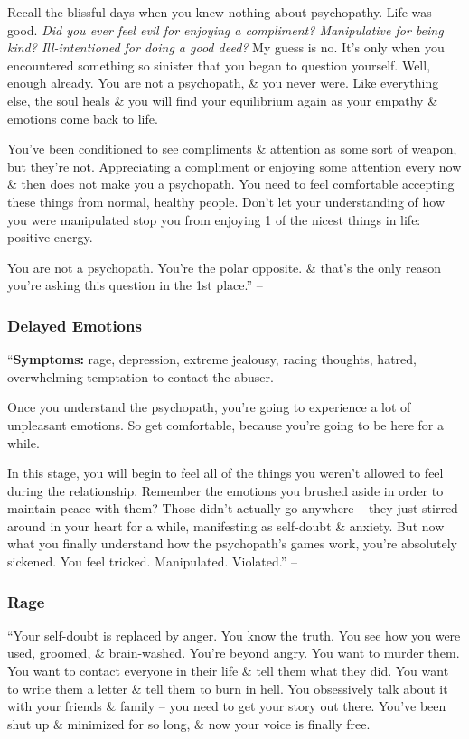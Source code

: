 \documentclass{article}
\numberwithin{equation}{section}
\begin{document}
Recall the blissful days when you knew nothing about psychopathy. Life was good. \textit{Did you ever feel evil for enjoying a compliment? Manipulative for being kind? Ill-intentioned for doing a good deed?} My guess is no. It's only when you encountered something so sinister that you began to question yourself. Well, enough already. You are not a psychopath, \& you never were. Like everything else, the soul heals \& you will find your equilibrium again as your empathy \& emotions come back to life.

You've been conditioned to see compliments \& attention as some sort of weapon, but they're not. Appreciating a compliment or enjoying some attention every now \& then does not make you a psychopath. You need to feel comfortable accepting these things from normal, healthy people. Don't let your understanding of how you were manipulated stop you from enjoying 1 of the nicest things in life: positive energy.

You are not a psychopath. You're the polar opposite. \& that's the only reason you're asking this question in the 1st place.'' -- \cite[pp. 116--122]{MacKenzie2015}

\subsubsection{Delayed Emotions}
``\textbf{Symptoms:} rage, depression, extreme jealousy, racing thoughts, hatred, overwhelming temptation to contact the abuser.

Once you understand the psychopath, you're going to experience a lot of unpleasant emotions. So get comfortable, because you're going to be here for a while.

In this stage, you will begin to feel all of the things you weren't allowed to feel during the relationship. Remember the emotions you brushed aside in order to maintain peace with them? Those didn't actually go anywhere -- they just stirred around in your heart for a while, manifesting as self-doubt \& anxiety. But now what you finally understand how the psychopath's games work, you're absolutely sickened. You feel tricked. Manipulated. Violated.'' -- \cite[p. 122]{MacKenzie2015}

\subsubsection{Rage}
``Your self-doubt is replaced by anger. You know the truth. You see how you were used, groomed, \& brain-washed. You're beyond angry. You want to murder them. You want to contact everyone in their life \& tell them what they did. You want to write them a letter \& tell them to burn in hell. You obsessively talk about it with your friends \& family -- you need to get your story out there. You've been shut up \& minimized for so long, \& now your voice is finally free.
\end{document}
